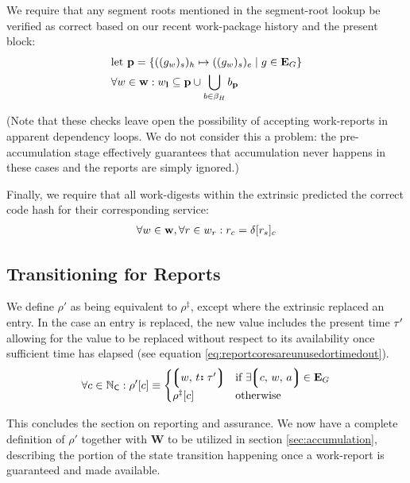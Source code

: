 We require that any segment roots mentioned in the segment-root lookup be verified as correct based on our recent work-package history and the present block:
\begin{align}
  &\text{let } \mathbf{p} = \{ ((g_w)_s)_h \mapsto ((g_w)_s)_e \mid g \in \mathbf{E}_G \} \\
  &\forall w \in \mathbf{w}: w_\mathbf{l} \subseteq \mathbf{p} \cup \bigcup_{b \in \beta_H} b_\mathbf{p}
\end{align}

(Note that these checks leave open the possibility of accepting work-reports in apparent dependency loops. We do not consider this a problem: the pre-accumulation stage effectively guarantees that accumulation never happens in these cases and the reports are simply ignored.)

Finally, we require that all work-digests within the extrinsic predicted the correct code hash for their corresponding service:
\begin{align}\label{eq:reportcodesarecorrect}
  \forall w \in \mathbf{w}, \forall r \in w_r : r_c = \delta[r_s]_c
\end{align}









\subsection{Transitioning for Reports}

We define $\rho'$ as being equivalent to $\rho^\ddagger$, except where the extrinsic replaced an entry. In the case an entry is replaced, the new value includes the present time $\tau'$ allowing for the value to be replaced without respect to its availability once sufficient time has elapsed (see equation \ref{eq:reportcoresareunusedortimedout}).
\begin{equation}
    \forall c \in \coreindex : \rho'[c] \equiv \begin{cases}
      \tup{w,\,\is{t}{\thetime'}} &\when \exists \tup{c,\,w,\,a} \in \xtguarantees \\
      \rho^\ddagger[c] &\otherwise
    \end{cases}
\end{equation}

This concludes the section on reporting and assurance. We now have a complete definition of $\rho'$ together with $\mathbf{W}$ to be utilized in section \ref{sec:accumulation}, describing the portion of the state transition happening once a work-report is guaranteed and made available.
